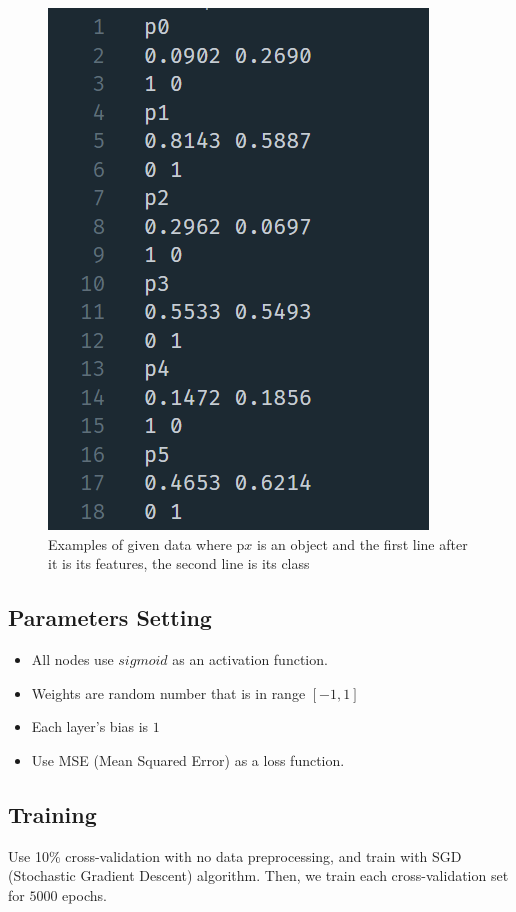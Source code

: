 \documentclass{article}
\begin{document}
\begin{figure}[ht]
	\centering
	\includegraphics[scale=0.5]{cross_data}
	\caption{Examples of given data where p$x$ is an object and 
	the first line after it is its features, the second line is its class}
\end{figure}
\FloatBarrier

\subsection*{Parameters Setting}
\begin{itemize}
	\item All nodes use $sigmoid$ as an activation function.
	\item Weights are random number that is in range $[-1, 1]$
	\item Each layer's bias is $1$
	\item Use MSE (Mean Squared Error) as a loss function.
\end{itemize}

\subsection*{Training}
Use 10\% cross-validation with no data preprocessing, and train with SGD (Stochastic Gradient Descent) algorithm. Then, we train each cross-validation set for $5000$ epochs.
\end{document}
